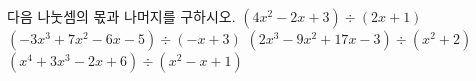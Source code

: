 다음 나눗셈의 몫과 나머지를 구하시오.
 $(4x^2-2x+3)\div(2x+1)$
 $(-3x^3+7x^2-6x-5)\div(-x+3)$
 $(2x^3-9x^2+17x-3)\div(x^2+2)$
 $(x^4+3x^3-2x+6)\div(x^2-x+1)$
